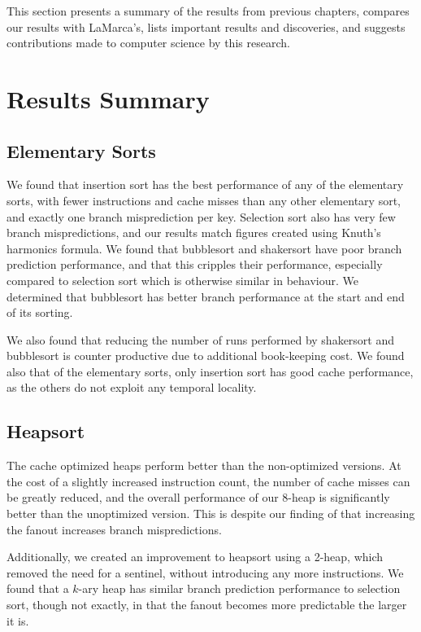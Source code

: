 \label{conclusions}
This section presents a summary of the results from previous chapters, compares
our results with LaMarca's, lists important results and discoveries, and
suggests contributions made to computer science by this research.

\section{Results Summary}


\subsection{Elementary Sorts}

We found that insertion sort has the best performance of any of the elementary
sorts, with fewer instructions and cache misses than any other elementary sort,
and exactly one branch misprediction per key. Selection sort also has very few
branch mispredictions, and our results match figures created using Knuth's
harmonics formula. We found that bubblesort and shakersort have poor branch
prediction performance, and that this cripples their performance, especially
compared to selection sort which is otherwise similar in behaviour. We
determined that bubblesort has better branch performance at the start and end of
its sorting.

We also found that reducing the number of runs performed by shakersort and
bubblesort is counter productive due to additional book-keeping cost. We found
also that of the elementary sorts, only insertion sort has good cache
performance, as the others do not exploit any temporal locality.


\subsection{Heapsort}

The cache optimized heaps perform better than the non-optimized versions. At the
cost of a slightly increased instruction count, the number of cache misses can
be greatly reduced, and the overall performance of our 8-heap is significantly
better than the unoptimized version. This is despite our finding of that
increasing the fanout increases branch mispredictions.

Additionally, we created an improvement to heapsort using a 2-heap, which
removed the need for a sentinel, without introducing any more instructions. We
found that a $k$-ary heap has similar branch prediction performance to selection
sort, though not exactly, in that the fanout becomes more predictable the larger
it is.


